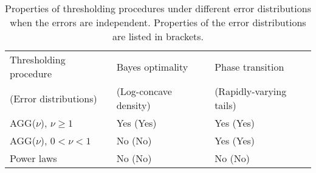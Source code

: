 
\begin{table}[ht]
    \centering
    \caption{Properties of thresholding procedures under different error distributions when the errors are independent. 
    Properties of the error distributions are listed in brackets.}
    \medskip
    \begin{tabular}{p{40mm}p{37mm}p{37mm}} \toprule
        Thresholding procedure & Bayes optimality &  Phase transition \\ 
        (Error distributions) &  (Log-concave density) & (Rapidly-varying tails) \\ \midrule
        AGG($\nu$), $\nu\ge1$ & Yes (Yes) & Yes (Yes) \\ \cmidrule{1-3}
        AGG($\nu$), $0<\nu<1$ & No (No) & Yes (Yes) \\ \cmidrule{1-3}
        Power laws & No (No) & No (No) \\ \bottomrule
    \end{tabular}
    \label{table:role-of-thresholding}
\end{table}







